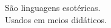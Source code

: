 \documentclass[preview]{standalone}
\begin{document}
São linguagens esotéricas.\\Usados em meios didáticos.\\
\end{document}

